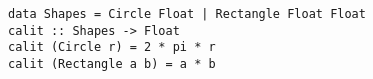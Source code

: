 \texttt{data Shapes = Circle Float | Rectangle Float Float} \\
\texttt{calit :: Shapes -> Float} \\
\texttt{calit (Circle r) = 2 * pi * r} \\
\texttt{calit (Rectangle a b) = a * b} \\